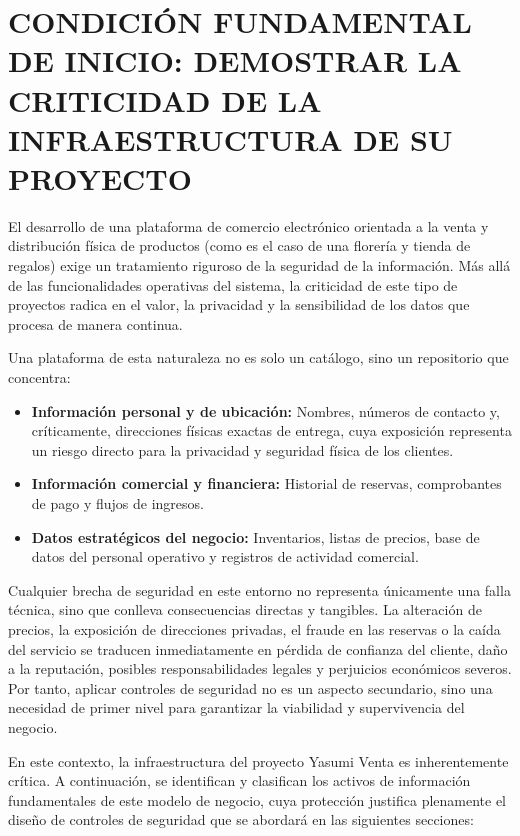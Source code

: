 \documentclass[12pt,letterpaper]{article}
\begin{document}
\section{CONDICIÓN FUNDAMENTAL DE INICIO: DEMOSTRAR LA CRITICIDAD DE LA INFRAESTRUCTURA DE SU PROYECTO}

El desarrollo de una plataforma de comercio electrónico orientada a la venta y distribución física de productos (como es el caso de una florería y tienda de regalos) exige un tratamiento riguroso de la seguridad de la información. Más allá de las funcionalidades operativas del sistema, la criticidad de este tipo de proyectos radica en el valor, la privacidad y la sensibilidad de los datos que procesa de manera continua. 

Una plataforma de esta naturaleza no es solo un catálogo, sino un repositorio que concentra:
\begin{itemize}
    \item \textbf{Información personal y de ubicación:} Nombres, números de contacto y, críticamente, direcciones físicas exactas de entrega, cuya exposición representa un riesgo directo para la privacidad y seguridad física de los clientes.
    \item \textbf{Información comercial y financiera:} Historial de reservas, comprobantes de pago y flujos de ingresos.
    \item \textbf{Datos estratégicos del negocio:} Inventarios, listas de precios, base de datos del personal operativo y registros de actividad comercial.
\end{itemize}

Cualquier brecha de seguridad en este entorno no representa únicamente una falla técnica, sino que conlleva consecuencias directas y tangibles. La alteración de precios, la exposición de direcciones privadas, el fraude en las reservas o la caída del servicio se traducen inmediatamente en pérdida de confianza del cliente, daño a la reputación, posibles responsabilidades legales y perjuicios económicos severos. Por tanto, aplicar controles de seguridad no es un aspecto secundario, sino una necesidad de primer nivel para garantizar la viabilidad y supervivencia del negocio.

En este contexto, la infraestructura del proyecto Yasumi Venta es inherentemente crítica. A continuación, se identifican y clasifican los activos de información fundamentales de este modelo de negocio, cuya protección justifica plenamente el diseño de controles de seguridad que se abordará en las siguientes secciones:
\pagebreak
\end{document}

